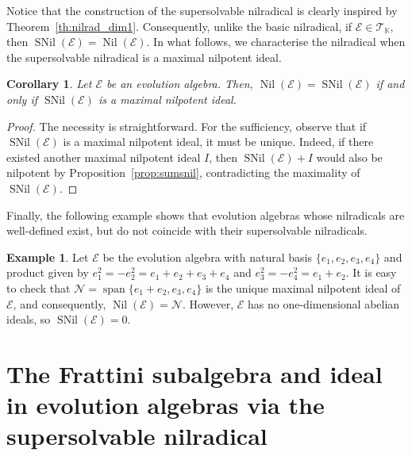 \documentclass[12pt,reqno]{amsart}
\newtheorem{corollary}[theorem]{Corollary}
\theoremstyle{definition}
\newtheorem{example}[theorem]{Example}
\theoremstyle{remark}
\DeclareMathOperator{\spa}{span}
\DeclareMathOperator{\nil}{Nil}
\DeclareMathOperator{\snil}{SNil}
\numberwithin{equation}{section}
\begin{document}
Notice that the construction of the supersolvable nilradical is clearly inspired by Theorem~\ref{th:nilrad_dim1}. Consequently, unlike the basic nilradical, if $\mathcal{E}\in\mathcal{T}_\mathbb{K}$, then $\snil(\mathcal{E})=\nil(\mathcal{E})$. In what follows, we characterise the nilradical when the supersolvable nilradical is a maximal nilpotent ideal.

\begin{corollary}\label{cor:snil_max}
	Let $\mathcal{E}$ be an evolution algebra. Then, $\nil(\mathcal{E})=\snil(\mathcal{E})$ if and only if $\snil(\mathcal{E})$ is a maximal nilpotent ideal.
\end{corollary}
\begin{proof}
	The necessity is straightforward.
	For the sufficiency, observe that if $\snil(\mathcal{E})$ is a maximal nilpotent ideal, it must be unique. Indeed, if there existed another maximal nilpotent ideal $I$, then $\snil(\mathcal{E})+I$ would also be nilpotent by Proposition~\ref{prop:sumsnil}, contradicting the maximality of $\snil(\mathcal{E})$.
\end{proof}

Finally, the following example shows that evolution algebras whose nilradicals are well-defined exist, but do not coincide with their supersolvable nilradicals.

\begin{example}
	Let $\mathcal{E}$ be the evolution algebra with natural basis $\{e_1,e_2,e_3,e_4\}$ and product given by $e_1^2=-e_2^2=e_1+e_2+e_3+e_4$ and $e_3^2=-e_4^2=e_1+e_2$. It is easy to check that $\mathcal{N}=\spa\{e_1+e_2,e_3,e_4\}$ is the unique maximal nilpotent ideal of $\mathcal{E}$, and consequently, $\nil(\mathcal{E})=\mathcal{N}$. However, $\mathcal{E}$ has no one-dimensional abelian ideals, so $\snil(\mathcal{E})=0$.
\end{example}

\section{The Frattini subalgebra and ideal in evolution algebras via the supersolvable nilradical}\label{sec:4}
\end{document}
